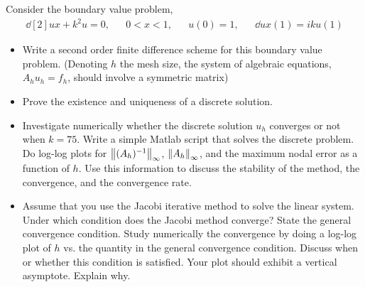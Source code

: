 \documentclass[10pt]{article}
\begin{document}
\begin{problem}
Consider the boundary value problem,
\begin{align*}
    \dd[2]{u}{x}+k^2u=0, && 0<x<1, &&u(0)=1, && \dd{u}{x}(1)=iku(1)
\end{align*}
\begin{itemize}[nolistsep]
\item Write a second order finite difference scheme for this boundary value problem. (Denoting \( h \) the mesh size, the system of algebraic equations, \( A_hu_h = f_h \), should involve a symmetric matrix)
\item Prove the existence and uniqueness of a discrete solution.
\item Investigate numerically whether the discrete solution \( u_h \) converges or not when \( k = 75 \). Write a simple Matlab script that solves the discrete problem. Do log-log plots for \( \left\lVert(A_h)^{-1}\right\rVert_\infty\), \( \left\lVert A_h\right\rVert_\infty \), and the maximum nodal error as a function of \( h \). Use this information to discuss the stability of the method, the convergence, and the convergence rate.
\item Assume that you use the Jacobi iterative method to solve the linear system. Under which condition does the Jacobi method converge? State the general convergence condition. Study numerically the convergence by doing a log-log plot of \( h \) vs. the quantity in the general convergence condition. Discuss when or whether this condition is satisfied. Your plot should exhibit a vertical asymptote. Explain why.
\end{itemize}
\end{problem}
\end{document}
